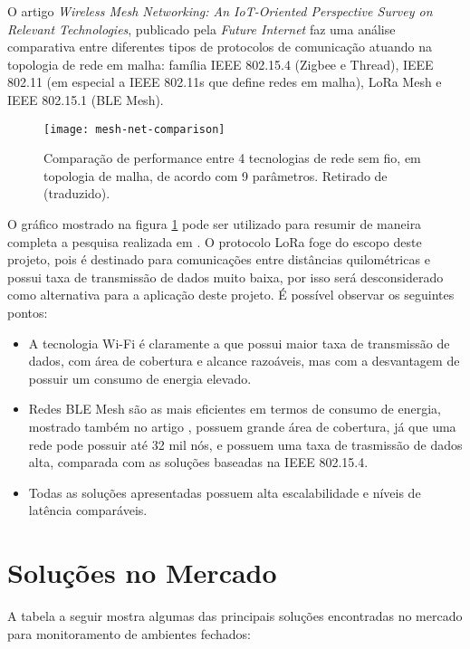 \documentclass[../monografia.tex]{subfiles}
\begin{document}
O artigo \textit{Wireless Mesh Networking: An IoT-Oriented Perspective Survey on Relevant Technologies}, publicado pela \textit{Future Internet}\cite{mesh-net-comparison} faz uma análise comparativa entre diferentes tipos de protocolos de comunicação atuando na topologia de rede em malha: família IEEE 802.15.4 (Zigbee e Thread), IEEE 802.11 (em especial a IEEE 802.11s que define redes em malha), LoRa Mesh e IEEE 802.15.1 (BLE Mesh).

\begin{figure}[h!]
\centering
	\texttt{[image: mesh-net-comparison]}
	\caption{
		Comparação de performance entre 4 tecnologias de rede sem fio, em topologia de malha, de acordo com 9 parâmetros. Retirado de \cite{mesh-net-comparison} (traduzido).
	}
	\label{fig:Comparação redes mesh}
\end{figure}

O gráfico mostrado na figura \ref{fig:Comparação redes mesh}  pode ser utilizado para resumir de maneira completa a pesquisa realizada em \cite{mesh-net-comparison}. O protocolo LoRa foge do escopo deste projeto, pois é destinado para comunicações entre distâncias quilométricas e possui taxa de transmissão de dados muito baixa, por isso será desconsiderado como alternativa para a aplicação deste projeto. É possível observar os seguintes pontos:

\begin{itemize}
	\item A tecnologia Wi-Fi é claramente a que possui maior taxa de transmissão de dados, com área de cobertura e alcance razoáveis, mas com a desvantagem de possuir um consumo de energia elevado.
	\item Redes BLE Mesh são as mais eficientes em termos de consumo de energia, mostrado também no artigo \cite{zigbee-ble-power}, possuem grande área de cobertura, já que uma rede pode possuir até 32 mil nós\cite{BLE-mesh}, e possuem uma taxa de trasmissão de dados alta, comparada com as soluções baseadas na IEEE 802.15.4.
	\item Todas as soluções apresentadas possuem alta escalabilidade e níveis de latência comparáveis.
\end{itemize}


\section{Soluções no Mercado} 

A tabela a seguir mostra algumas das principais soluções encontradas no mercado para monitoramento de ambientes fechados: 
\end{document}
